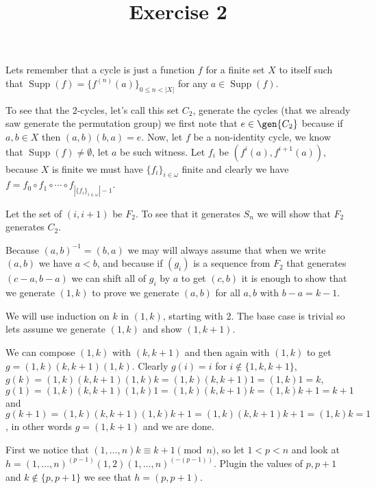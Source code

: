 

\usepackage{skak}
\usepackage{relsize}
\usepackage{graphicx}
\usepackage{mathtools}

\usepackage{textcomp}
\usepackage{bbding}

\usepackage{soul}

\newcommand{\flower}{\text{\scalebox{0.75}{\raisebox{-0.7ex}{
				\rotatebox{90}{\textleaf}\hspace{-0.3em}
				\scalebox{0.7}{\textleaf}\hspace{-1.35em}
				\raisebox{1ex}{\scalebox{0.8}{\FiveFlowerOpen}}
}}}}
\title{Exercise 2}

\maketitle
\begin{cExercise}[][][author][1]
	\begin{cPart}
		Lets remember that a cycle is just a function $f$ for a finite set $X$ to itself such that $\operatorname{Supp}(f)=\{f^{(n)}(a)\}_{0\le n<|X|}$ for any $a\in \operatorname{Supp}(f)$.
		
		To see that the $2$-cycles, let's call this set $C_2$, generate the cycles (that we already saw generate the permutation group) we first note that $e\in\gen{C_2}$ because if $a,b\in X$ then $(a,b)(b,a)=e$. Now, let $f$ be a non-identity cycle, we know that $\operatorname{Supp}(f)\ne\emptyset$, let $a$ be such witness. Let $f_i$ be $(f^{i}(a),f^{i+1}(a))$, because $X$ is finite we must have $\{f_i\}_{i\in\omega}$ finite and clearly we have $f=f_0\circ f_1\circ\cdots\circ f_{|\{f_i\}_{i\in\omega}|-1}$.
	\end{cPart}
	\begin{cPart}
		Let the set of $(i,i+1)$ be $F_2$. To see that it generates $S_n$ we will show that $F_2$ generates $C_2$.
		
		Because $(a,b)^{-1}=(b,a)$ we may will always assume that when we write $(a,b)$ we have $a<b$, and because if $(g_i)$ is a sequence from $F_2$ that generates $(c-a,b-a)$ we can shift all of $g_i$ by $a$ to get $(c,b)$ it is enough to show that we generate $(1,k)$ to prove we generate $(a,b)$ for all $a,b$ with $b-a=k-1$.
		
		We will use induction on $k$ in $(1,k)$, starting with $2$. The base case is trivial so lets assume we generate $(1,k)$ and show $(1,k+1)$.
		
		We can compose $(1,k)$ with $(k,k+1)$ and then again with $(1,k)$ to get $g=(1,k)(k,k+1)(1,k)$. Clearly $g(i)=i$ for $i\notin\{1,k,k+1\}$, $g(k)=(1,k)(k,k+1)(1,k)k=(1,k)(k,k+1)1=(1,k)1=k$, $g(1)=(1,k)(k,k+1)(1,k)1=(1,k)(k,k+1)k=(1,k)k+1=k+1$ and $g(k+1)=(1,k)(k,k+1)(1,k)k+1=(1,k)(k,k+1)k+1=(1,k)k=1$, in other words $g=(1,k+1)$ and we are done.
	\end{cPart}
	\begin{cPart}
		First we notice that $(1,\ldots,n)k\equiv k+1\pmod{n}$, so let $1<p<n$ and look at $h=(1,\ldots,n)^{(p-1)}(1,2)(1,\ldots,n)^{(-(p-1))}$. Plugin the values of $p,p+1$ and $k\notin \{p,p+1\}$ we see that $h=(p,p+1)$.
	\end{cPart}
\end{cExercise}

